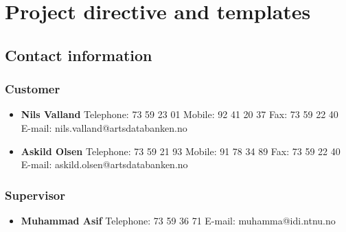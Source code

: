 \appendix

\section{Project directive and templates}
	
	\subsection{Contact information}
		\subsubsection{Customer}
			\begin{itemize}
				\item {\bf Nils Valland} \newline
						Telephone: 73 59 23 01 \newline
						Mobile: 92 41 20 37 \newline
						Fax: 73 59 22 40 \newline
						E-mail: nils.valland@artsdatabanken.no
				\item {\bf Askild Olsen} \newline
						Telephone: 73 59 21 93 \newline
						Mobile: 91 78 34 89 \newline
						Fax: 73 59 22 40 \newline
						E-mail: askild.olsen@artsdatabanken.no
			\end{itemize}
			
		\subsubsection{Supervisor}
			\begin{itemize}
				\item {\bf Muhammad Asif} \newline
						Telephone: 73 59 36 71 \newline
						E-mail: muhamma@idi.ntnu.no
			\end{itemize}

